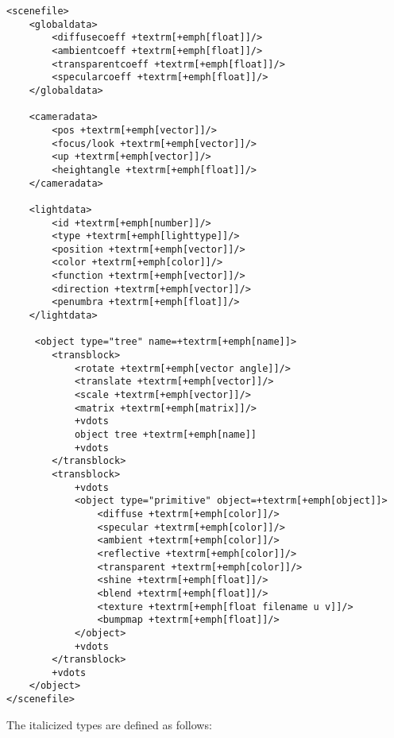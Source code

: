 \documentclass{scrartcl}
\begin{document}
\begin{Verbatim}[commandchars=+\[\]]
<scenefile>
    <globaldata>
        <diffusecoeff +textrm[+emph[float]]/>
        <ambientcoeff +textrm[+emph[float]]/>
        <transparentcoeff +textrm[+emph[float]]/>
        <specularcoeff +textrm[+emph[float]]/>
    </globaldata>
  
    <cameradata>
        <pos +textrm[+emph[vector]]/>
        <focus/look +textrm[+emph[vector]]/>
        <up +textrm[+emph[vector]]/>
        <heightangle +textrm[+emph[float]]/>
    </cameradata>

    <lightdata>
        <id +textrm[+emph[number]]/>
        <type +textrm[+emph[lighttype]]/>
        <position +textrm[+emph[vector]]/>
        <color +textrm[+emph[color]]/>
        <function +textrm[+emph[vector]]/>
        <direction +textrm[+emph[vector]]/>
        <penumbra +textrm[+emph[float]]/>
    </lightdata>

     <object type="tree" name=+textrm[+emph[name]]>
        <transblock>
            <rotate +textrm[+emph[vector angle]]/>
            <translate +textrm[+emph[vector]]/>
            <scale +textrm[+emph[vector]]/>
            <matrix +textrm[+emph[matrix]]/>
            +vdots
            object tree +textrm[+emph[name]]
            +vdots
        </transblock>
        <transblock>
            +vdots
            <object type="primitive" object=+textrm[+emph[object]]>
                <diffuse +textrm[+emph[color]]/>
                <specular +textrm[+emph[color]]/>
                <ambient +textrm[+emph[color]]/>
                <reflective +textrm[+emph[color]]/>
                <transparent +textrm[+emph[color]]/>
                <shine +textrm[+emph[float]]/>
                <blend +textrm[+emph[float]]/>
                <texture +textrm[+emph[float filename u v]]/>
                <bumpmap +textrm[+emph[float]]/>
            </object>
            +vdots
        </transblock>
        +vdots
    </object>
</scenefile>
\end{Verbatim}
The italicized types are defined as follows:
\end{document}
